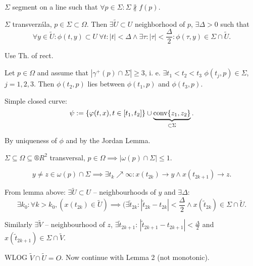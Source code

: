 \documentclass[12pt]{article}					%
\begin{document}
\begin{definice}[Transverzála]
	$\Sigma$ segment on a line such that $\forall p \in \Sigma: \Sigma \not\parallel f(p)$.
\end{definice}

\begin{lemma}
	$\Sigma$ transverzála, $p \in \Sigma \subset \Omega$. Then $\exists \tilde U \subset U$ neighborhood of $p$, $\exists \Delta > 0$ such that
	$$ \forall y \in \tilde U: \phi(t, y) \subset U\ \forall t: |t| < \Delta \land \exists \tau: |\tau| < \frac{\Delta}{2}: \phi(\tau, y) \in \Sigma \cap \tilde U. $$

	\begin{dukazin}
		Use Th. of rect.
	\end{dukazin}
\end{lemma}

\begin{lemma}
	Let $p \in \Omega$ and assume that $|\gamma^+(p) \cap \Sigma| ≥ 3$, i. e. $\exists t_1 < t_2 < t_3$ $\phi(t_j, p) \in \Sigma$, $j=1, 2, 3$. Then $\phi(t_2, p)$ lies between $\phi(t_1, p)$ and $\phi(t_3, p)$.


	\begin{dukazin}
		Simple closed curve:
		$$ \psi := \{\varphi(t, x), t \in [t_1, t_2]\} \cup \underbrace{\operatorname{conv}\{z_1, z_2\}}_{\subset \Sigma}. $$

		By uniqueness of $\phi$ and by the Jordan Lemma.
	\end{dukazin}
\end{lemma}

\begin{lemma}
	$\Sigma \subseteq \Omega \subseteq ®R^2$ transversal, $p \in \Omega \implies |\omega(p) \cap \Sigma| ≤ 1$.

	\begin{dukazin}
		$$ y ≠ z \in \omega(p) \cap \Sigma \implies \exists t_k \nearrow ∞: x(t_{2k}) \rightarrow y \land x(t_{2k + 1}) \rightarrow z. $$

		From lemma above: $\exists \tilde U \subset U$ – neighbourhoods of $y$ and $\exists \Delta$:
		$$ \exists k_0: \forall k > k_0, (x(t_{2k}) \in \tilde U) \implies (\exists \tilde t_{2k}: |\tilde t_{2k} - t_{2k}| < \frac{\Delta}{2} \land x(\tilde t_{2k}) \in \Sigma \cap \tilde U. $$

		Similarly $\exists \tilde V$ – neighbourhood of $z$, $\exists \tilde t_{2k+1}$: $|\tilde t_{2k+1} - t_{2k+1}| < \frac{\Delta}{2}$ and $x(\tilde t_{2k+1}) \in \Sigma \cap \tilde V$.

		WLOG $\tilde V \cap \tilde U = O$. Now continue with Lemma 2 (not monotonic).
	\end{dukazin}
\end{lemma}
\end{document}
